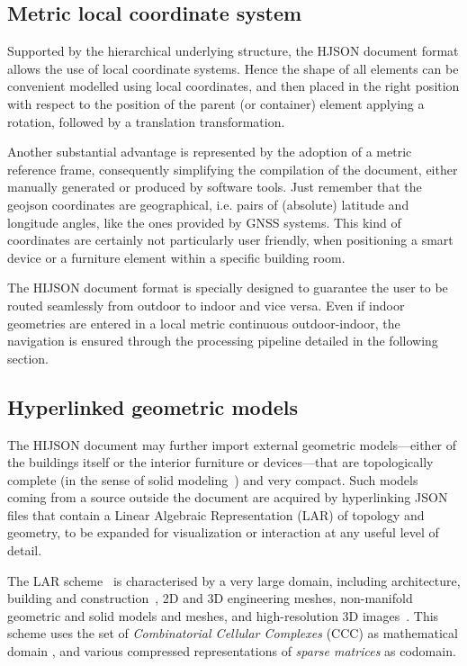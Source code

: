\subsection{Metric local coordinate system}\label{metric-local-coordinate-system}

Supported by the hierarchical underlying structure, the HJSON document format allows 
the use of local coordinate systems. Hence the shape of all elements can 
be convenient modelled using local coordinates, and then placed in the right position 
with respect to the position of the parent (or container) element applying a rotation, followed by a
translation transformation.

Another substantial advantage is represented by the adoption of a metric reference frame, 
consequently simplifying the compilation of the document, either manually generated or produced by software tools.
Just remember that the geojson coordinates are geographical, i.e. pairs of (absolute) latitude and longitude angles, like the ones provided by GNSS systems. This kind of coordinates  are certainly not particularly user friendly, when positioning a smart device or a furniture element within a specific building room.

The HIJSON document format is specially designed to guarantee the user to be routed seamlessly 
from outdoor to indoor and vice versa. Even if indoor geometries are entered in a local metric 
 continuous outdoor-indoor, the navigation is ensured through the processing pipeline
detailed in the following section.

\subsection{Hyperlinked geometric models}\label{optional-lar}

The HIJSON document may further import external geometric models---either of the buildings itself or the interior furniture or devices---that are topologically complete (in the sense of solid modeling~\cite{Requicha:1980:RRS:356827.356833}) and very compact. 
Such models coming from a source outside the document are acquired by hyperlinking JSON files that contain a Linear Algebraic Representation (LAR) of topology and geometry, to be expanded for visualization or interaction at any useful level of detail. 

The LAR scheme~\cite{Dicarlo:2014:TNL:2543138.2543294} is characterised by a very large domain, including architecture, building and construction~\cite{paoluzziMS:2014}, 2D and 3D engineering meshes, non-manifold geometric and solid models and meshes, and high-resolution 3D images~\cite{cadanda:2015}. This scheme uses the set of \emph{Combinatorial Cellular Complexes} (CCC) as mathematical domain
\cite{Basak:2010}, and various compressed representations of \emph{sparse matrices} \cite{gemmexp} as codomain. 


